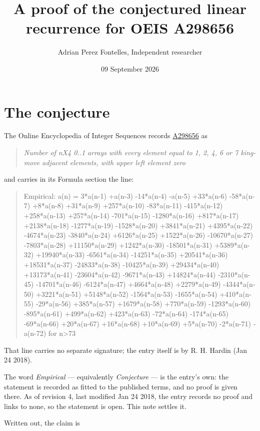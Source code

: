 \documentclass[11pt]{article}
\title{A proof of the conjectured linear recurrence for OEIS A298656}
\author{Adrian Perez Fontelles, Independent researcher}
\date{09 September 2026}
\theoremstyle{definition}
\begin{document}
\maketitle
\section{The conjecture}

The Online Encyclopedia of Integer Sequences records \href{https://oeis.org/A298656}{A298656} as

\begin{quote}\itshape Number of nX4 0..1 arrays with every element equal to 1, 2, 4, 6 or 7 king-move adjacent elements, with upper left element zero\end{quote}

and carries in its Formula section the line:

\begin{quote}\ttfamily Empirical: a(n) = 3*a(n-1) +a(n-3) -14*a(n-4) -a(n-5) +33*a(n-6) -58*a(n-7) +8*a(n-8) +31*a(n-9) +257*a(n-10) -83*a(n-11) -415*a(n-12) +258*a(n-13) +257*a(n-14) -701*a(n-15) -1280*a(n-16) +817*a(n-17) +2138*a(n-18) -1277*a(n-19) -1528*a(n-20) +3841*a(n-21) +4395*a(n-22) -4674*a(n-23) -3840*a(n-24) +6126*a(n-25) +1522*a(n-26) -10670*a(n-27) -7803*a(n-28) +11150*a(n-29) +1242*a(n-30) -18501*a(n-31) +5389*a(n-32) +19940*a(n-33) -6561*a(n-34) -14251*a(n-35) +20541*a(n-36) +18531*a(n-37) -24833*a(n-38) -10425*a(n-39) +29434*a(n-40) +13173*a(n-41) -23604*a(n-42) -9671*a(n-43) +14824*a(n-44) -2310*a(n-45) -14701*a(n-46) -6124*a(n-47) +4664*a(n-48) +2279*a(n-49) -4344*a(n-50) +3221*a(n-51) +5148*a(n-52) -1564*a(n-53) -1655*a(n-54) +410*a(n-55) -29*a(n-56) +385*a(n-57) +1679*a(n-58) +770*a(n-59) -1293*a(n-60) -895*a(n-61) +499*a(n-62) +423*a(n-63) -72*a(n-64) -174*a(n-65) -69*a(n-66) +20*a(n-67) +16*a(n-68) +10*a(n-69) +5*a(n-70) -2*a(n-71) -a(n-72) for n>73\end{quote}

That line carries no separate signature; the entry itself is by R. H. Hardin (Jan 24 2018).

The word {\itshape Empirical} --- equivalently {\itshape Conjecture} --- is the entry's own: the statement is recorded as fitted to the published terms, and no proof is given there. As of revision 4, last modified Jan 24 2018, the entry records no proof and links to none, so the statement is open. This note settles it.

Written out, the claim is
\end{document}
